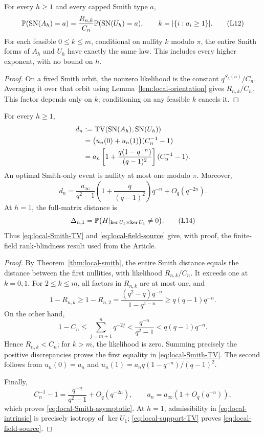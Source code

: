 \begin{theorem}
\label{thm:local-smith}
For every \(h\ge1\) and every capped Smith type \(a\),
\[
 \mathbb P(\operatorname{SN}(A_h)=a)
   =\frac{R_{n,k}}{C_n}\mathbb P(\operatorname{SN}(U_h)=a),
 \qquad k=|\{i:a_i\ge1\}|.
 \tag{L12}\label{eq:local-Smith-law}
\]
For each feasible \(0\le k\le m\), conditional on nullity \(k\)
modulo \(\pi\), the entire Smith forms of \(A_h\) and \(U_h\)
have exactly the same law. This includes every higher exponent,
with no bound on \(h\).
\end{theorem}

\begin{proof}
On a fixed Smith orbit, the nonzero likelihood is the constant
\(q^{S_h(a)}/C_n\). Averaging it over that orbit using
Lemma~\ref{lem:local-orientation} gives \(R_{n,k}/C_n\).
This factor depends only on \(k\); conditioning on any feasible
\(k\) cancels it.
\end{proof}

\begin{corollary}
\label{cor:local-Smith-TV}
For every \(h\ge1\),
\begin{align}
 d_n&:=\operatorname{TV}(\operatorname{SN}(A_h),\operatorname{SN}(U_h))\nonumber\\
 &=\bigl(u_n(0)+u_n(1)\bigr)(C_n^{-1}-1)\label{eq:local-Smith-TV}\\
 &=a_n\left[1+\frac{q(1-q^{-n})}{(q-1)^2}\right](C_n^{-1}-1).
 \nonumber
\end{align}
An optimal Smith-only event is nullity at most one modulo \(\pi\).
Moreover,
\[
 d_n=\frac{a_\infty}{q^2-1}
       \left(1+\frac{q}{(q-1)^2}\right)q^{-n}
       +O_q(q^{-2n}).
 \tag{L13}\label{eq:local-Smith-asymptotic}
\]
At \(h=1\), the full-matrix distance is
\[
 \Delta_{n,1}
   =\mathbb P\bigl(H|_{\ker U_1\times\ker U_1}\ne0\bigr).
 \tag{L14}\label{eq:local-field-source}
\]
Thus \eqref{eq:local-Smith-TV} and \eqref{eq:local-field-source}
give, with proof, the finite-field rank-blindness result used from
the Article.
\end{corollary}

\begin{proof}
By Theorem~\ref{thm:local-smith}, the entire Smith distance equals
the distance between the first nullities, with likelihood
\(R_{n,k}/C_n\). It exceeds one at \(k=0,1\).
For \(2\le k\le m\), all factors in \(R_{n,k}\) are at most one,
and
\[
 1-R_{n,k}\ge1-R_{n,2}
   =\frac{(q^2-q)q^{-n}}{1-q^{1-n}}
   \ge q(q-1)q^{-n}.
\]
On the other hand,
\[
 1-C_n\le\sum_{j=m+1}^n q^{-2j}
       <\frac{q^{-n}}{q^2-1}
       <q(q-1)q^{-n}.
\]
Hence \(R_{n,k}<C_n\); for \(k>m\), the likelihood is zero.
Summing precisely the positive discrepancies proves the first equality
in \eqref{eq:local-Smith-TV}.
The second follows from
\(u_n(0)=a_n\) and
\(u_n(1)=a_n q(1-q^{-n})/(q-1)^2\).

Finally,
\[
 C_n^{-1}-1=\frac{q^{-n}}{q^2-1}+O_q(q^{-2n}),
 \qquad a_n=a_\infty(1+O_q(q^{-n})),
\]
which proves \eqref{eq:local-Smith-asymptotic}.
At \(h=1\), admissibility in \eqref{eq:local-intrinsic} is precisely
isotropy of \(\ker U_1\); \eqref{eq:local-support-TV} proves
\eqref{eq:local-field-source}.
\end{proof}

